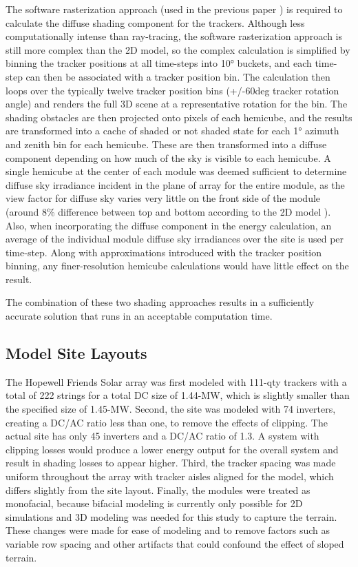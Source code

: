 \documentclass[conference]{IEEEtran}
\begin{document}
The software rasterization approach (used in the previous paper \cite{Mikofski_9300381}) is required to calculate the diffuse shading component for the trackers. Although less computationally intense than ray-tracing, the software rasterization approach is still more complex than the 2D model, so the complex calculation is simplified by binning the tracker positions at all time-steps into 10° buckets, and each time-step can then be associated with a tracker position bin. The calculation then loops over the typically twelve tracker position bins (+/-60deg tracker rotation angle) and renders the full 3D scene at a representative rotation for the bin. The shading obstacles are then projected onto pixels of each hemicube, and the results are transformed into a cache of shaded or not shaded state for each 1° azimuth and zenith bin for each hemicube. These are then transformed into a diffuse component depending on how much of the sky is visible to each hemicube. A single hemicube at the center of each module was deemed sufficient to determine diffuse sky irradiance incident in the plane of array for the entire module, as the view factor for diffuse sky varies very little on the front side of the module (around 8\% difference between top and bottom according to the 2D model \cite{Mikofski_8980572}). Also, when incorporating the diffuse component in the energy calculation, an average of the individual module diffuse sky irradiances over the site is used per time-step. Along with approximations introduced with the tracker position binning, any finer-resolution hemicube calculations would have little effect on the result.

The combination of these two shading approaches results in a sufficiently accurate solution that runs in an acceptable computation time.

\subsection{Model Site Layouts}

The Hopewell Friends Solar array was first modeled with 111-qty trackers with a total of 222 strings for a total DC size of 1.44-MW, which is slightly smaller than the specified size of 1.45-MW. Second, the site was modeled with 74 inverters, creating a DC/AC ratio less than one, to remove the effects of clipping. The actual site has only 45 inverters and a DC/AC ratio of 1.3. A system with clipping losses would produce a lower energy output for the overall system and result in shading losses to appear higher. Third, the tracker spacing was made uniform throughout the array with tracker aisles aligned for the model, which differs slightly from the site layout. Finally, the modules were treated as monofacial, because bifacial modeling is currently only possible for 2D simulations and 3D modeling was needed for this study to capture the terrain. These changes were made for ease of modeling and to remove factors such as variable row spacing and other artifacts that could confound the effect of sloped terrain.
\end{document}
